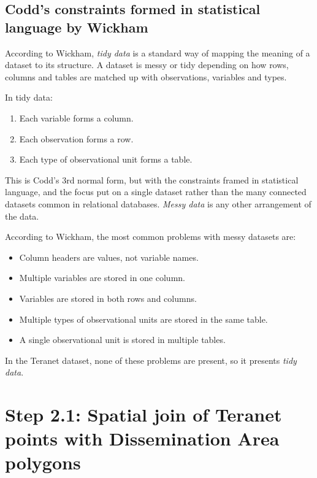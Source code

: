 \subsection{Codd's constraints formed in statistical language by Wickham} \label{subsec:teranet_tidy_data}

According to Wickham\cite{Wickham2014}, \textit{tidy data} is a standard way of mapping the meaning of a dataset to its structure.
A dataset is messy or tidy depending on how rows, columns and tables are matched up with observations,
variables and types.

\vspace{5mm}

In tidy data:
\begin{enumerate}
    \item Each variable forms a column.
    \item Each observation forms a row.
    \item Each type of observational unit forms a table.
\end{enumerate}

This is Codd's 3rd normal form\cite{Codd1990}, but with the constraints framed in statistical
language, and the focus put on a single dataset rather than the many connected datasets common in relational databases.
\textit{Messy data} is any other arrangement of the data.

\vspace{5mm}

According to Wickham, the most common problems with messy datasets are:
\begin{itemize}
    \item Column headers are values, not variable names.
    \item Multiple variables are stored in one column.
    \item Variables are stored in both rows and columns.
    \item Multiple types of observational units are stored in the same table.
    \item A single observational unit is stored in multiple tables.
\end{itemize}

In the Teranet dataset, none of these problems are present, so it presents \textit{tidy data}.

\section{Step 2.1: Spatial join of Teranet points with Dissemination Area polygons} \label{sec:teranet_da_spatial_join}

